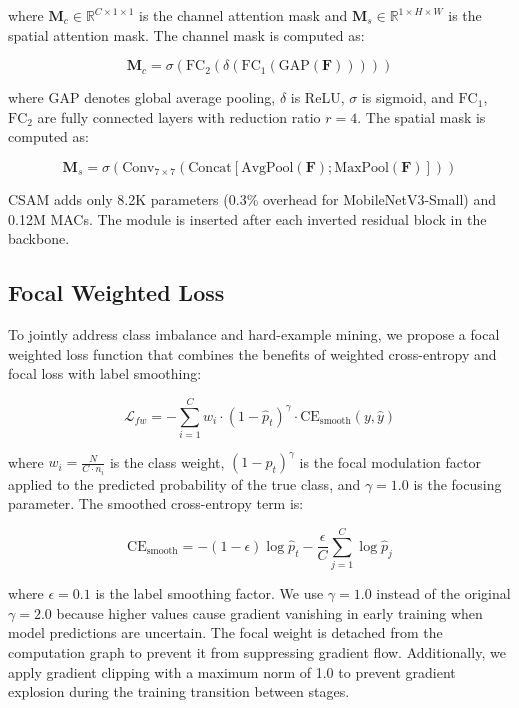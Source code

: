\documentclass[apajournal,article,submit,pdftex,moreauthors]{Definitions/mdpi}
\begin{document}
where $\mathbf{M}_c \in \mathbb{R}^{C \times 1 \times 1}$ is the channel attention mask and $\mathbf{M}_s \in \mathbb{R}^{1 \times H \times W}$ is the spatial attention mask. The channel mask is computed as:

\begin{equation}
\mathbf{M}_c = \sigma(\text{FC}_2(\delta(\text{FC}_1(\text{GAP}(\mathbf{F})))))
\end{equation}

where GAP denotes global average pooling, $\delta$ is ReLU, $\sigma$ is sigmoid, and $\text{FC}_1$, $\text{FC}_2$ are fully connected layers with reduction ratio $r=4$. The spatial mask is computed as:

\begin{equation}
\mathbf{M}_s = \sigma(\text{Conv}_{7 \times 7}(\text{Concat}[\text{AvgPool}(\mathbf{F}); \text{MaxPool}(\mathbf{F})]))
\end{equation}

CSAM adds only 8.2K parameters (0.3\% overhead for MobileNetV3-Small) and 0.12M MACs. The module is inserted after each inverted residual block in the backbone.

\subsection{Focal Weighted Loss}

To jointly address class imbalance and hard-example mining, we propose a focal weighted loss function that combines the benefits of weighted cross-entropy and focal loss with label smoothing:

\begin{equation}
\mathcal{L}_{fw} = -\sum_{i=1}^{C} w_i \cdot (1 - \hat{p}_t)^\gamma \cdot \text{CE}_{\text{smooth}}(y, \hat{y})
\end{equation}

where $w_i = \frac{N}{C \cdot n_i}$ is the class weight, $(1 - \hat{p}_t)^\gamma$ is the focal modulation factor applied to the predicted probability of the true class, and $\gamma = 1.0$ is the focusing parameter. The smoothed cross-entropy term is:

\begin{equation}
\text{CE}_{\text{smooth}} = -(1 - \epsilon) \log \hat{p}_t - \frac{\epsilon}{C} \sum_{j=1}^{C} \log \hat{p}_j
\end{equation}

where $\epsilon = 0.1$ is the label smoothing factor. We use $\gamma = 1.0$ instead of the original $\gamma = 2.0$ because higher values cause gradient vanishing in early training when model predictions are uncertain. The focal weight is detached from the computation graph to prevent it from suppressing gradient flow. Additionally, we apply gradient clipping with a maximum norm of 1.0 to prevent gradient explosion during the training transition between stages.
\end{document}
